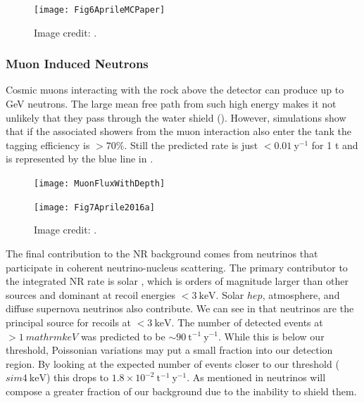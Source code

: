 \begin{figure}
\centering
\texttt{[image: Fig6AprileMCPaper]}
\caption{Image credit: .}
\label{fig:backgrounds_nuclear_radiogenic_rates}
\end{figure}



\subsubsection{Muon Induced Neutrons}
\label{subsubsec:backgrounds_nuclear_muon_induced}
Cosmic muons interacting with the rock above the detector can produce up to GeV neutrons.  The large mean free path from such high energy
makes it not unlikely that they pass through the water shield ().  However, simulations show that if
the associated showers from the muon interaction also enter the tank the tagging efficiency is $> 70\%$.  Still the predicted rate is just
$< 0.01\ \mathrm{y^{-1}}$ for 1 t and is represented by the blue line in .

\begin{figure}
\centering
\texttt{[image: MuonFluxWithDepth]}
\label{fig:backgrounds_nuclear_muon_induced_flux}
\end{figure}

\begin{figure}
\centering
\texttt{[image: Fig7Aprile2016a]}
\caption{Image credit: .}
\label{fig:backgrounds_nuclear_muon_induced_nr_rate}
\end{figure}



\label{subsubsec:backgrounds_nuclear_neutrinos}
The final contribution to the NR background comes from neutrinos that participate in coherent neutrino-nucleus scattering.  The primary
contributor to the integrated NR rate is solar , which is orders of magnitude larger than other sources and dominant at
recoil energies $< 3\ \mathrm{keV}$.  Solar $hep$, atmosphere, and diffuse supernova neutrinos also contribute.  We can see in
 that neutrinos are the principal source for recoils at $< 3\ \mathrm{keV}$.  The
number of detected events at $> 1\ mathrm{keV}$ was predicted to be ${\sim} 90\ \mathrm{t^{-1}\ y^{-1}}$.  While this is below our
threshold, Poissonian variations may put a small fraction into our detection region.  By looking at the expected number of events closer
to our threshold (${sim} 4\ \mathrm{keV}$) this drops to $1.8 \times 10^{-2}\ \mathrm{t^{-1}\ y^{-1}}$.  As mentioned in
 neutrinos will compose a greater fraction of our background due to the inability
to shield them.




